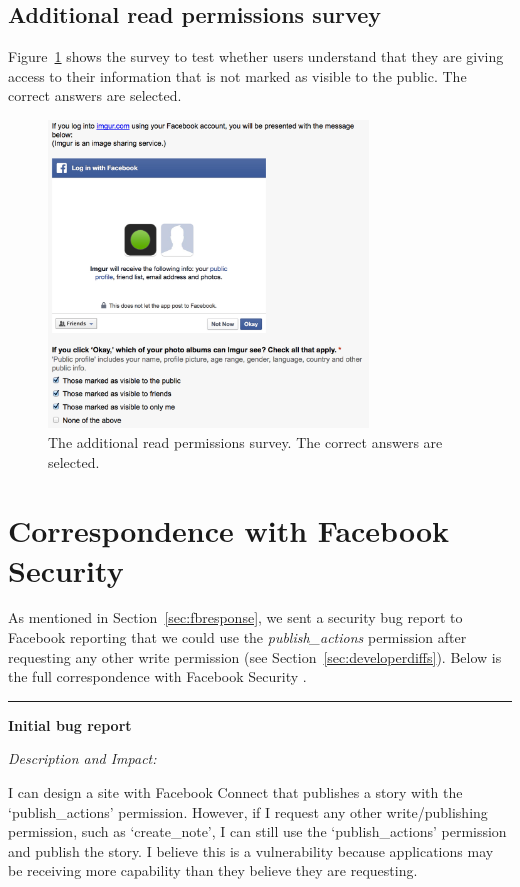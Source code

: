 \documentclass[10pt]{sig-alternate-10pt}
\begin{document}
\subsection{Additional read permissions survey}
\label{appendix:readsurvey2}
Figure~\ref{figure:71r} shows the survey to test whether users understand that they are giving access to their information that is not marked as visible to the public. The correct answers are selected.

\begin{figure}[h!]
  \centering
  \includegraphics[width=8.5cm]{71r}
  \caption{The additional read permissions survey. The correct answers are selected.}
  \label{figure:71r}
\end{figure}

\FloatBarrier

\section{Correspondence with Facebook Security}
\label{appendix:correspondence}

As mentioned in Section~\ref{sec:fbresponse}, we sent a security bug report to Facebook reporting that we could use the \emph{publish\_actions} permission after requesting any other write permission (see Section~\ref{sec:developerdiffs}). Below is the full correspondence with Facebook Security \cite{fbsecurity}.

\noindent\rule{6cm}{0.4pt}

\noindent\textbf{Initial bug report}

\noindent \emph{Description and Impact:}

\noindent I can design a site with Facebook Connect that publishes a story with the `publish\_actions' permission. However, if I request any other write/publishing permission, such as `create\_note', I can still use the `publish\_actions' permission and publish the story.  I believe this is a vulnerability because applications may be receiving more capability than they believe they are requesting.
\end{document}
